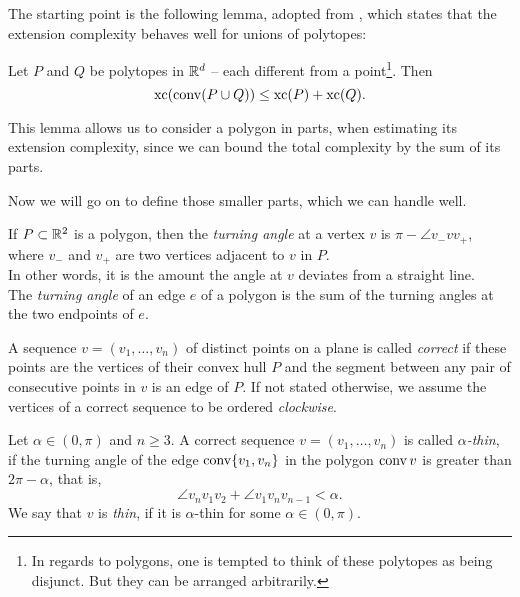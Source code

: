 The starting point is the following lemma, adopted from \cite[Proposition 3.1.1]{weltge2015sizes}, which states that the extension complexity behaves well for unions of polytopes:
\begin{lemma}\label{lemma:union}
  Let $P$ and $Q$ be polytopes in $\mathbb{R}^d$ -- each different from a point\footnote{In regards to polygons, one is tempted to think of these polytopes as being disjunct. But they can be arranged arbitrarily.}. Then $$\operatorname{xc}(\operatorname{conv}(P \cup Q)) \leq \operatorname{xc}(P) + \operatorname{xc}(Q) .$$
\end{lemma}

This lemma allows us to consider a polygon in parts, when estimating its extension complexity, since we can bound the total complexity by the sum of its parts.

Now we will go on to define those smaller parts, which we can handle well.

\begin{definition}
  If $P\subset\mathbb{R}^2$ is a polygon, then the \emph{turning angle} at a vertex $v$ is $\pi-\angle v_-vv_+$, where $v_-$ and $v_+$ are two vertices adjacent to $v$ in $P$. \\
  In other words, it is the amount the angle at $v$ deviates from a straight line. \\
  The \emph{turning angle} of an edge $e$ of a polygon is the sum of the turning angles at the two endpoints of $e$.
\end{definition}

\begin{definition}
  A sequence $v=(v_1,\ldots,v_n)$ of distinct points on a plane is called \emph{correct} if these points are the vertices of their convex hull $P$ and the segment between any pair of consecutive points in $v$ is an edge of $P$.
  If not stated otherwise, we assume the vertices of a correct sequence to be ordered \emph{clockwise}.
\end{definition}

\begin{definition}
  Let $\alpha\in(0,\pi)$ and $n \geq 3$. A correct sequence ${v=(v_1,\ldots,v_n)}$ is called \emph{$\alpha$-thin}, if the turning angle of the edge $\operatorname{conv}\{v_1, v_n\}$ in the polygon $\operatorname{conv} v$ is greater than $2\pi-\alpha$, that is, $$\angle v_n v_1 v_2+\angle v_1v_nv_{n-1}<\alpha.$$ We say that $v$ is \emph{thin}, if it is $\alpha$-thin for some $\alpha\in(0,\pi)$.
\end{definition}

